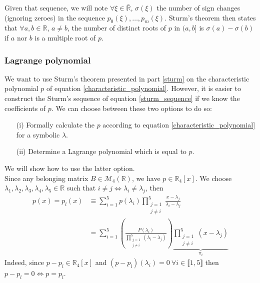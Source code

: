 \documentclass[class=report, float=false, crop=false]{standalone}
\begin{document}
Given that sequence, we will note $\forall \xi \in \bar{\mathbb{R}}$, $\sigma(\xi)$ the number of sign changes (ignoring zeroes) in the sequence $p_0(\xi),\ldots,p_m(\xi)$. Sturm's theorem then states that $\forall a,b \in \mathbb{R}$, $a \neq b$, the number of distinct roots of $p$ in $(a,b]$ is $\sigma(a) - \sigma(b)$ if $a$ nor $b$ is a multiple root of $p$.

\subsubsection{Lagrange polynomial}

We want to use Sturm's theorem presented in part \ref{sturm} on the characteristic polynomial $p$ of equation \ref{characteristic_polynomial}. However, it is easier to construct the Sturm's sequence of equation \ref{sturm_sequence} if we know the coefficients of $p$. We can choose between these two options to do so:
\begin{itemize}
\item[(i)] Formally calculate the $p$ according to equation \ref{characteristic_polynomial} for a symbolic $\lambda$.
\item[(ii)] Determine a Lagrange polynomial \cite{wiki:lagrange} which is equal to $p$.
\end{itemize}
We will show how to use the latter option.\\

Since any belonging matrix $B \in \mathcal{M}_4(\mathbb{R})$, we have $p \in \mathbb{R}_4[x]$. We choose $\lambda_1, \lambda_2, \lambda_3, \lambda_4, \lambda_5 \in \mathbb{R}$ such that $i \neq j \Leftrightarrow \lambda_i \neq \lambda_j$, then
\begin{align*}
p(x) = p_l(x) &\equiv \sum_{i=1}^5 p(\lambda_i) \prod_{\substack{j=1\\j\neq i}}^5 \frac{x - \lambda_j}{\lambda_i - \lambda_j}\\
&= \sum_{i=1}^5 \left(\frac{P(\lambda_i)}{\prod_{\substack{j=1\\j\neq i}}^5 (\lambda_i - \lambda_j)}\right) \underbrace{\prod_{\substack{j=1\\j\neq i}}^5 (x - \lambda_j)}_{\pi_i}
\end{align*}
Indeed, since $p-p_l \in \mathbb{R}_4[x]$ and $(p-p_l)(\lambda_i) = 0~ \forall i \in \llbracket1,5\rrbracket$ then $p-p_l=0 \Leftrightarrow p = p_l$.\\
\end{document}
